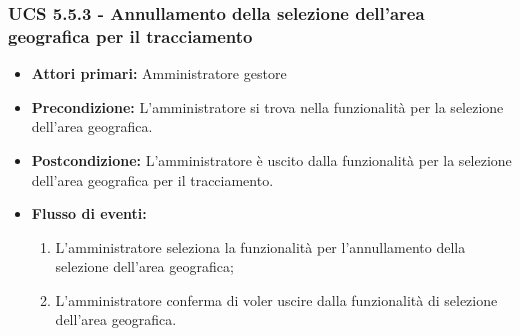 \subsubsection{UCS 5.5.3 - Annullamento della selezione dell'area geografica per il tracciamento}%
\begin{itemize}
\item \textbf{Attori primari:} Amministratore gestore
\item \textbf{Precondizione:} L'amministratore si trova nella funzionalità per la selezione dell'area geografica.
\item \textbf{Postcondizione:} L'amministratore è uscito dalla funzionalità per la selezione dell'area geografica per il tracciamento.
\item \textbf{Flusso di eventi:}
    \begin{enumerate}
    \item L'amministratore seleziona la funzionalità per l'annullamento della selezione dell'area geografica;
    \item L'amministratore conferma di voler uscire dalla funzionalità di selezione dell'area geografica.
    \end{enumerate} 
\end{itemize}